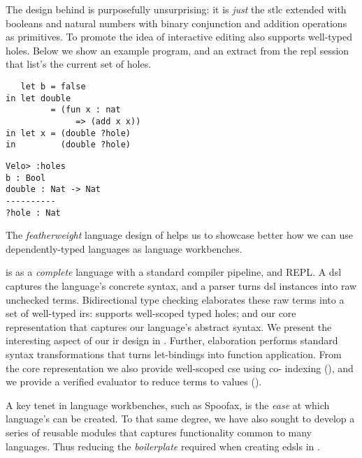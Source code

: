 
The design behind \Velo{} is purposefully unsurprising:
%
it is \emph{just} the \ac{stlc} extended with booleans and natural numbers with binary conjunction and addition operations as primitives.
%
To promote the idea of interactive editing \Velo{} also supports well-typed holes.
%
Below we show an example \Velo{} program, and an extract from the \acs*{repl} session that list's the current set of holes.

\begin{center}
  \begin{minipage}[t]{0.45\linewidth}
\begin{Verbatim}
   let b = false
in let double
         = (fun x : nat
              => (add x x))
in let x = (double ?hole)
in         (double ?hole)
\end{Verbatim}
\end{minipage}
\hfill
  \begin{minipage}[t]{0.45\linewidth}
    \begin{Verbatim}
Velo> :holes
b : Bool
double : Nat -> Nat
----------
?hole : Nat
\end{Verbatim}
\end{minipage}

\end{center}

The \emph{featherweight} language design of \Velo{} helps us to showcase better how we can use dependently-typed languages as language workbenches.


\Velo{} is as a \emph{complete} language with a standard compiler pipeline, and REPL. %
%
A \ac{dsl} captures the language's concrete syntax, and a parser turns \ac{dsl} instances into raw unchecked terms.
%
Bidirectional type checking elaborates these raw terms into a set of well-typed \acp{ir}:
%
 supports well-scoped typed holes;
%
and
%
 our core representation that captures our language's abstract syntax.
%
We present the interesting aspect of our \ac{ir} design in .
%
Further, elaboration performs standard syntax transformations that turns let-bindings into function application.
%
From the core representation we also provide well-scoped \ac{cse} using co-\DeBruijn{} indexing (), and we provide a verified evaluator to reduce terms to values ().

A key tenet in language workbenches, such as Spoofax, is the \emph{ease} at which language's can be created.
To that same degree, we have also sought to develop a series of reusable modules that captures functionality common to many languages.
Thus reducing the \emph{boilerplate} required when creating \acp{edsl} in \Idris{}.


